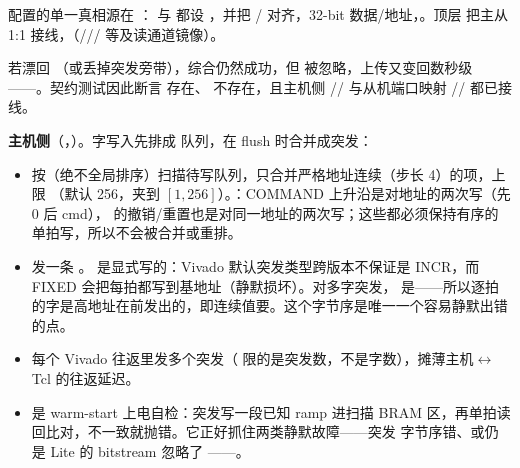 \documentclass[11pt,oneside,openany]{book}
\begin{document}
配置的单一真相源在 ： 与  都设 ，并把  /  对齐，32-bit 数据/地址，。顶层  把主从 1:1 接线，（/// 等及读通道镜像）。

\begin{notebox}[一个静默退化点]
若漂回 （或丢掉突发旁带），综合仍然成功，但  被忽略，上传又变回数秒级——。契约测试因此断言  存在、 不存在，且主机侧 // 与从机端口映射 // 都已接线。
\end{notebox}

\textbf{主机侧}（，）。字写入先排成  队列，在 flush 时合并成突发：

\begin{itemize}
  \item {} 按（绝不全局排序）扫描待写队列，只合并严格地址连续（步长 4）的项，上限 （默认 256，夹到 $[1,256]$）。：COMMAND 上升沿是对地址的两次写（先 0 后 cmd）， 的撤销/重置也是对同一地址的两次写；这些都必须保持有序的单拍写，所以不会被合并或重排。
  \item {} 发一条 。 是显式写的：Vivado 默认突发类型跨版本不保证是 INCR，而 FIXED 会把每拍都写到基地址（静默损坏）。对多字突发， 是——所以逐拍的字是高地址在前发出的，即连续值要。这个字节序是唯一一个容易静默出错的点。
  \item {} 每个 Vivado 往返里发多个突发（ 限的是突发数，不是字数），摊薄主机$\leftrightarrow$Tcl 的往返延迟。
  \item {} 是 warm-start 上电自检：突发写一段已知 ramp 进扫描 BRAM 区，再单拍读回比对，不一致就抛错。它正好抓住两类静默故障——突发  字节序错、或仍是 Lite 的 bitstream 忽略了 ——。
\end{itemize}
\end{document}
